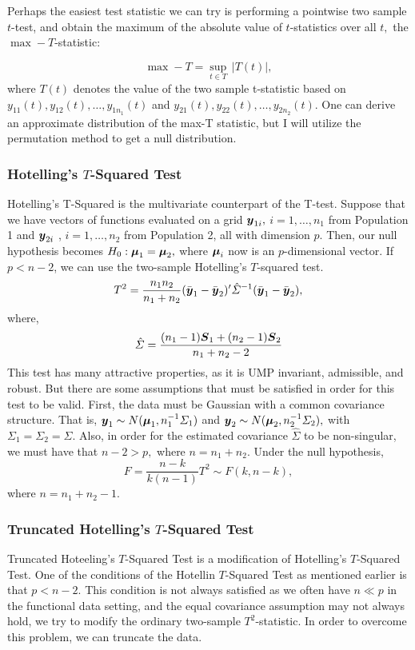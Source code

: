 \documentclass[12pt]{article}
\newcommand{\bmu}{\mbox{\boldmath $\mu$}}
\newcommand{\by}{\mbox{\boldmath$y$}}
\newcommand{\bS}{\mbox{\boldmath$S$}}
\begin{document}
Perhaps the easiest test statistic we can try is performing a pointwise two sample
$t$-test, and obtain the maximum of the absolute value of $t$-statistics over all $t,$
 the $\max-T$-statistic:

    \[\max-T = \underset{t \in T}{\sup}\, |T(t)|,\]
 where $T (t) $ denotes the value of the two sample t-statistic based on
    $y_{11}(t), y_{12}(t), \dots, y_{1n_{1}}(t) $ and $y_{21}(t), y_{22}(t),\dots,y_{2n_{2}}(t).$
     One can derive an approximate distribution of the max-T statistic, but I will utilize the
     permutation method to get a null distribution.

 \subsubsection{Hotelling's $T$-Squared Test}
 Hotelling’s T-Squared is the multivariate counterpart of the T-test.
 Suppose that we have vectors of functions evaluated on a grid $\by_{1i},$
 $i = 1,\dots, n_1$ from Population 1 and $\by_{2i}$ , $i = 1,\dots, n_2$ from Population 2,
 all with dimension $p.$ Then, our null hypothesis becomes $H_0:\bmu_1 = \bmu_2,$ where $\bmu_i$
 now is an $p$-dimensional vector. If $p < n - 2$, we can use the two-sample Hotelling’s $T$-squared test.
\[T^2 = \frac{n_1n_2}{n_1+n_2}(\bar{\by}_1 - \bar{\by}_2)' \hat{\Sigma}^{-1} ( \bar{\by}_1 - \bar{\by}_2), \]
where,
    \[\hat{\Sigma} = \frac{ (n_1-1)\bS_1 + (n_2-1)\bS_2}{n_1+n_2-2}\]
This test has many attractive properties, as it is UMP invariant, admissible, and robust.
But there are some assumptions that must be satisfied in order for this test to be valid.
First, the data must be Gaussian with a common covariance structure. That is,
$\by _1 \sim N (\bmu_1 , n_1^{-1} \Sigma_1) $ and
$\by _2 \sim N(\bmu_2, n_2^{-1}\Sigma_2),$ with $\Sigma_1 = \Sigma_2 = \Sigma.$
Also, in order for the estimated covariance $ \hat{\Sigma}$ to be non-singular,
we must have that $n-2> p,$  where $n=n_1 +n_2.$     Under the null hypothesis,
    \[F= \frac{n-k}{k(n-1)} T^2 \sim F(k, n-k),\]
    where $n=n_1+n_2-1.$

    \subsubsection{Truncated Hotelling's $T$-Squared Test}
Truncated Hoteeling's $T$-Squared Test is a modification of Hotelling's $T$-Squared Test.
One of the conditions of the Hotellin $T$-Squared Test as mentioned earlier is that $p < n-2$.
This condition is not always satisfied as we often have $n \ll p$ in the functional data setting,
and the equal covariance assumption may not always hold, we try to modify the ordinary two-sample
$T^2$-statistic. In order to overcome this problem, we can truncate the data.
\end{document}
